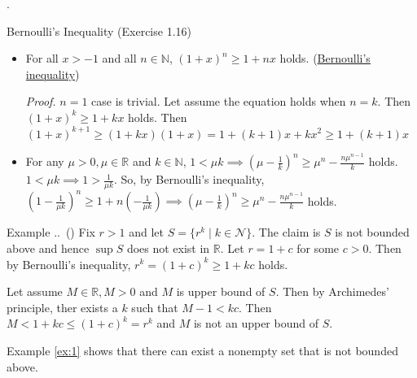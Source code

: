\documentclass[8pt]{beamer}
\newcounter{ex}
\renewcommand{\theex}{\thesection.\thesubsection.\arabic{ex}}
\renewenvironment{example}[1][]{%
    \refstepcounter{ex}%
    \begin{exampleblock}{Example \theex\if\relax\detokenize{#1}\relax\else\ (#1)\fi}%
}{%
    \end{exampleblock}%
}
\newcommand{\mbb}[1]{\mathbb{#1}}
\newcommand{\mc}[1]{\mathcal{#1}}
\newcommand{\ti}[1]{\textit{#1}}
\begin{document}
\begin{frame}{.}
    \begin{block}{Bernoulli's Inequality (Exercise 1.16)}
        \begin{itemize}
            \item  For all $x > -1$ and all $n \in \mbb{N}$, $(1+x)^n \geq 1 + nx$ holds. (\underline{Bernoulli's inequality})

            \ti{Proof.} $n=1$ case is trivial.
            Let assume the equation holds when $n=k$.
            Then $(1+x)^k \geq 1+ kx$ holds.
            Then $(1+x)^{k+1} \geq (1+kx)(1+x) = 1 + (k+1)x + kx^2 \geq 1 + (k+1)x$

            \item For any $\mu > 0, \mu \in \mbb{R}$ and $k \in \mbb{N}$, $1 < \mu k \implies (\mu - \frac{1}{k})^n \geq \mu^n - \frac{n \mu^{n-1}}{k}$ holds.
            $1 < \mu k \implies 1 > \frac{1}{\mu k}$. So, by Bernoulli's inequality, $(1 - \frac{1}{\mu k})^n \geq  1 + n(-\frac{1}{\mu k}) \implies (\mu - \frac{1}{k})^n \geq \mu^n - \frac{n \mu^{n-1}}{k}$ holds.
        \end{itemize}
    \end{block}

    \begin{example} \label{ex:1}
        Fix $r >1$ and let $S = \{r^k \mid k \in \mc{N}\}$.
        The claim is $S$ is not bounded above and hence $\sup S$ does not exist in $\mbb{R}$.
        Let $r = 1+c$ for some $c >0$.
        Then by Bernoulli's inequality, $r^k = (1+c)^k \geq 1+kc$ holds.

        Let assume $M \in \mbb{R}, M >0$ and $M$ is upper bound of $S$.
        Then by Archimedes' principle, ther exists a $k$ such that $M - 1 < kc$.
        Then $M < 1+kc \leq (1+c)^k = r^k$ and $M$ is not an upper bound of $S$.
    \end{example}

    Example \ref{ex:1} shows that there can exist a nonempty set that is not bounded above.
\end{frame}
\end{document}
